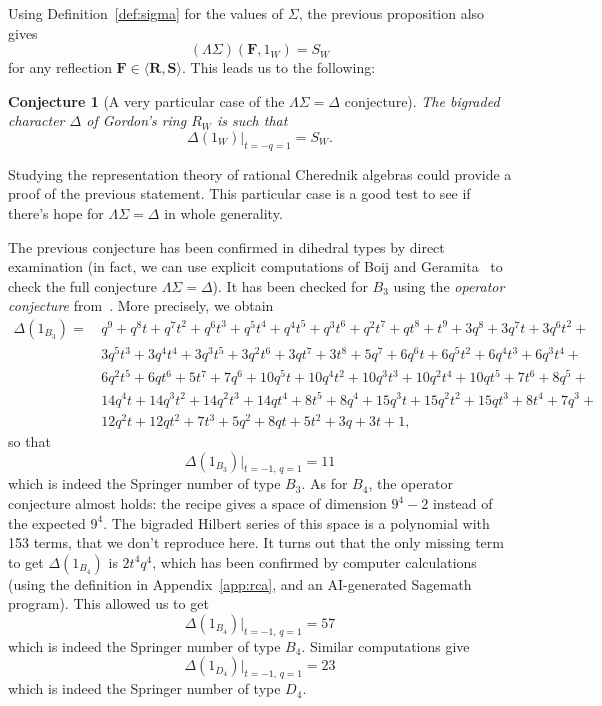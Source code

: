 \documentclass[11pt]{article}
\newtheorem{conj}[theo]{Conjecture}
\theoremstyle{definition}
\newtheorem{rema}[theo]{Remark}
\newcommand{\FFF}{\mathbf{F}}
\newcommand{\RRR}{\mathbf{R}}
\newcommand{\SSS}{\mathbf{S}}
\DeclareMathOperator{\CPF}{CPF}
\begin{document}

Using Definition~\ref{def:sigma} for the values of $\Sigma$, the previous proposition also gives
\[
    (\Lambda\Sigma)(\FFF,1_W) = S_W
\]
for any reflection $\FFF\in \langle \RRR,\SSS\rangle$.  This leads us to the following:

\begin{conj}[A very particular case of the $\Lambda\Sigma = \Delta$ conjecture]
    The bigraded character $\varDelta$ of Gordon's ring $R_W$ is such that
    \[
        \varDelta(1_W) \big\vert_{t=-q=1}
            =
        S_W.
    \]
\end{conj}

Studying the representation theory of rational Cherednik algebras could provide a proof of the previous statement.  This particular case is a good test to see if there's hope for $\Lambda\Sigma = \Delta$ in whole generality.

The previous conjecture has been confirmed in dihedral types by direct examination (in fact, we can use explicit computations of Boij and Geramita~\cite{boijgeramita} to check the full conjecture $\Lambda\Sigma=\Delta$).  It has been checked for $B_3$ using the {\it operator conjecture} from~\cite{haiman}.  More precisely, we obtain
\begin{align*}
    \varDelta(1_{B_3}) 
        = \,
    &q^9 + q^8t + q^7t^2 + q^6t^3 + q^5t^4 + q^4t^5 + q^3t^6 + q^2t^7 + qt^8 + t^9 + 3q^8 + 3q^7t + 3q^6t^2 +  \\
    & 3q^5t^3 + 3q^4t^4 +3q^3t^5 + 3q^2t^6 + 3qt^7 + 3t^8 + 5q^7 + 6q^6t + 6q^5t^2 + 6q^4t^3 + 6q^3t^4 + \\
    & 6q^2t^5 + 6qt^6 + 5t^7 + 7q^6 + 10q^5t + 10q^4t^2 + 10q^3t^3 + 10q^2t^4 + 10qt^5 + 7t^6 + 8q^5 + \\
    &  14q^4t + 14q^3t^2 + 14q^2t^3 + 14qt^4 + 8t^5 + 8q^4 + 15q^3t + 15q^2t^2 + 15qt^3 + 8t^4 + 7q^3 + \\ 
    & 12q^2t + 12qt^2 + 7t^3 + 5q^2 + 8qt + 5t^2 + 3q + 3t + 1,
\end{align*}
so that
\[
    \varDelta(1_{B_3})
    \big\vert_{t=-1,\, q=1}
        =
    11
\]
which is indeed the Springer number of type $B_3$.  As for $B_4$, the operator conjecture almost holds: the recipe gives a space of dimension $9^4-2$ instead of the expected $9^4$.  The bigraded Hilbert series of this space is a polynomial with 153 terms, that we don't reproduce here.  It turns out that the only missing term to get $\varDelta(1_{B_4})$ is $2t^4q^4$, which has been confirmed by computer calculations (using the definition in Appendix~\ref{app:rca}, and an AI-generated Sagemath program).  This allowed us to get
\[
    \varDelta(1_{B_4})
    \big\vert_{t=-1,\, q=1}
        =
    57
\]
which is indeed the Springer number of type $B_4$.  Similar computations give
\[
    \varDelta(1_{D_4})
    \big\vert_{t=-1,\, q=1}
        =
    23
\]
which is indeed the Springer number of type $D_4$.
\end{document}
